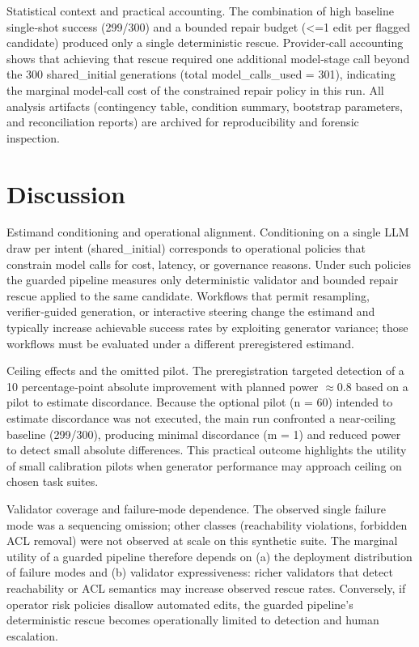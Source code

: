 \documentclass[conference]{IEEEtran}
\begin{document}
Statistical context and practical accounting. The combination of high baseline single‑shot success (299/300) and a bounded repair budget (<=1 edit per flagged candidate) produced only a single deterministic rescue. Provider‑call accounting shows that achieving that rescue required one additional model‑stage call beyond the 300 shared\_initial generations (total model\_calls\_used = 301), indicating the marginal model‑call cost of the constrained repair policy in this run. All analysis artifacts (contingency table, condition summary, bootstrap parameters, and reconciliation reports) are archived for reproducibility and forensic inspection.

\section{Discussion}
Estimand conditioning and operational alignment. Conditioning on a single LLM draw per intent (shared\_initial) corresponds to operational policies that constrain model calls for cost, latency, or governance reasons. Under such policies the guarded pipeline measures only deterministic validator and bounded repair rescue applied to the same candidate. Workflows that permit resampling, verifier‑guided generation, or interactive steering change the estimand and typically increase achievable success rates by exploiting generator variance; those workflows must be evaluated under a different preregistered estimand.

Ceiling effects and the omitted pilot. The preregistration targeted detection of a 10 percentage‑point absolute improvement with planned power \ensuremath{\approx}0.8 based on a pilot to estimate discordance. Because the optional pilot (n = 60) intended to estimate discordance was not executed, the main run confronted a near‑ceiling baseline (299/300), producing minimal discordance (m = 1) and reduced power to detect small absolute differences. This practical outcome highlights the utility of small calibration pilots when generator performance may approach ceiling on chosen task suites.

Validator coverage and failure‑mode dependence. The observed single failure mode was a sequencing omission; other classes (reachability violations, forbidden ACL removal) were not observed at scale on this synthetic suite. The marginal utility of a guarded pipeline therefore depends on (a) the deployment distribution of failure modes and (b) validator expressiveness: richer validators that detect reachability or ACL semantics may increase observed rescue rates. Conversely, if operator risk policies disallow automated edits, the guarded pipeline's deterministic rescue becomes operationally limited to detection and human escalation.
\end{document}
